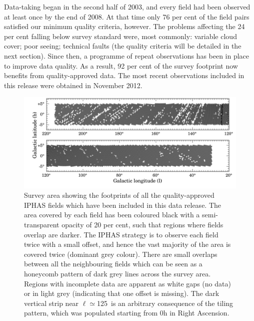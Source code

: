 \documentclass[a4paper,useAMS,usenatbib]{mn2e}
\begin{document}
Data-taking began in the second half of 2003, 
and every field had been observed at least once by the end of 2008.
At that time only 76 per cent of the field pairs 
satisfied our minimum quality criteria, however.
The problems affecting the 24 per cent falling below survey standard were,
most commonly: variable cloud cover;
poor seeing; technical faults
(the quality criteria will be detailed in the next section).
Since then, a programme of repeat observations has been in place 
to improve data quality. 
As a result, 92 per cent of the survey footprint
now benefits from quality-approved data.
The most recent observations included in this release
were obtained in November 2012.

\begin{figure}
        \includegraphics[width=1\linewidth]{figures/footprint/footprint_small.png}
        \caption{Survey area showing the footprints
        of all the quality-approved IPHAS fields
        which have been included in this data release.
        The area covered by each field has been coloured black
        with a semi-transparent opacity of 20 per cent,
        such that regions where fields overlap are darker.
        The IPHAS strategy is to observe each field twice
        with a small offset,
        and hence the vast majority of the area 
        is covered twice (dominant grey colour).
        There are small overlaps between all the neighbouring fields
        which can be seen as a honeycomb pattern
        of dark grey lines across the survey area.
        Regions with incomplete data are apparent as white gaps (no data) 
        or in light grey (indicating that one offset is missing).
        The dark vertical strip near $\ell \simeq$125\degr\ 
        is an arbitrary consequence of the tiling pattern,
        which was populated starting from 0h in Right Ascension.}
        \label{fig:footprint}
\end{figure}
\end{document}
